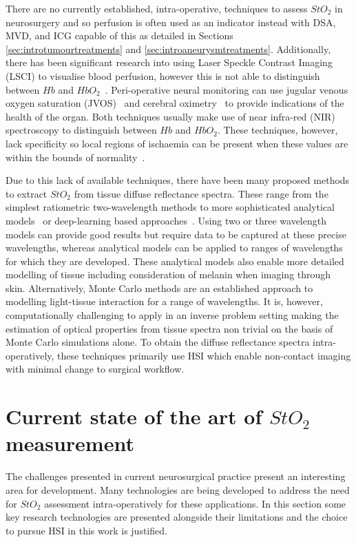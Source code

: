 There are no currently established, intra-operative, techniques to assess $StO_2$ in neurosurgery and so perfusion is often used as an indicator instead with DSA, MVD, and ICG capable of this as detailed in Sections \ref{sec:introtumourtreatments} and \ref{sec:introaneurysmtreatments}. Additionally, there has been significant research into using Laser Speckle Contrast Imaging (LSCI) to visualise blood perfusion, however this is not able to distinguish between $Hb$ and $HbO_2$~\citep{Dunn2012, Zhong2021}. Peri-operative neural monitoring can use jugular venous oxygen saturation (JVOS)~\citep{Raith2020} and cerebral oximetry~\citep{Lian2020} to provide indications of the health of the organ. Both techniques usually make use of near infra-red (NIR) spectroscopy to distinguish between $Hb$ and $HbO_2$. These techniques, however, lack specificity so local regions of ischaemia can be present when these values are within the bounds of normality~\citep{Raith2020, Zhong2021}.

Due to this lack of available techniques, there have been many proposed methods to extract $StO_2$ from tissue diffuse reflectance spectra. These range from the simplest ratiometric two-wavelength methods to more sophisticated analytical models~\citep{MacKenzie2018} or deep-learning based approaches~\citep{Ayala2023}. Using two or three wavelength models can provide good results but require data to be captured at these precise wavelengths, whereas analytical models can be applied to ranges of wavelengths for which they are developed. These analytical models also enable more detailed modelling of tissue including consideration of melanin when imaging through skin. Alternatively, Monte Carlo methods are an established approach to modelling light-tissue interaction for a range of wavelengths. It is, however, computationally challenging to apply in an inverse problem setting making the estimation of optical properties from tissue spectra non trivial on the basis of Monte Carlo simulations alone. To obtain the diffuse reflectance spectra intra-operatively, these techniques primarily use HSI which enable non-contact imaging with minimal change to surgical workflow. 

\section{Current state of the art of $StO_2$ measurement}\label{sec:stateofart}
The challenges presented in current neurosurgical practice present an interesting area for development. Many technologies are being developed to address the need for $StO_2$ assessment intra-operatively for these applications. In this section some key research technologies are presented alongside their limitations and the choice to pursue HSI in this work is justified. 

